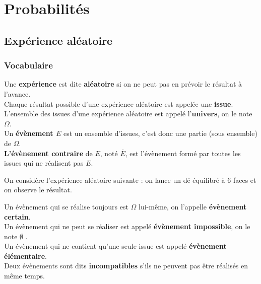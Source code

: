 


\chapter{Probabilités}




\section{Expérience aléatoire}
\subsection{Vocabulaire}
\begin{Définition}
Une {\bf{expérience}} est dite {\bf{aléatoire}} si on ne peut pas en prévoir le résultat à l'avance.\\
Chaque résultat possible d'une expérience aléatoire est appelée une {\bf{issue}}.\\
L'ensemble des issues d'une expérience aléatoire est appelé l'{\bf{univers}}, on le note $\Omega$.\\
Un {\bf{évènement $E$}} est un ensemble d'issues, c'est donc une partie (sous ensemble) de $\Omega$. \\
{\bf{L'évènement contraire}} de $E$, noté $\overline{E}$, est l'évènement formé par toutes les issues qui ne réalisent
pas $E$.

\end{Définition}

\begin{Exemple}
On considère l'expérience aléatoire suivante : on lance un dé équilibré à $6$ faces et on observe le résultat.
\vspace{0.3cm}

\ligne

\ligne

\ligne

\ligne

\ligne

\end{Exemple}

\begin{Définition}
Un évènement qui se réalise toujours est $\Omega$ lui-même, on l'appelle {\bf{évènement certain}}. \\
Un évènement qui ne peut se réaliser est appelé {\bf{évènement impossible}}, on le note $\emptyset$ . \\
Un évènement qui ne contient qu'une seule issue est appelé {\bf{évènement élémentaire}}.\\
Deux évènements sont dits {\bf{incompatibles}} s'ils ne peuvent pas être réalisés en même temps.
\end{Définition}

